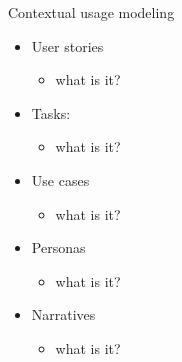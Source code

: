 \begin{Slide}{Contextual usage modeling}

\begin{itemize}
\item User stories
\begin{itemize}
\item what is it?

\end{itemize}
\item Tasks: 
\begin{itemize}
\item what is it?
\end{itemize}
\item Use cases
\begin{itemize}
\item what is it?
\end{itemize}
\item Personas
\begin{itemize}
\item what is it?
\end{itemize}
\item Narratives
\begin{itemize}
\item what is it?

\end{itemize}
\end{itemize}
\end{Slide}